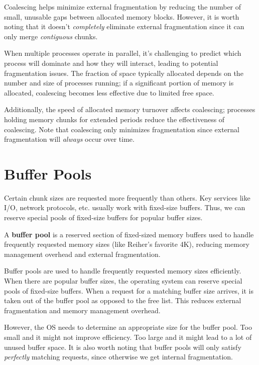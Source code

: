 \documentclass{report}
\newcommand{\definitionBegin}[1]{\begin{tcolorbox}[title={Definition: #1}]}
\newcommand{\definitionEnd}{\end{tcolorbox}}
\begin{document}
Coalescing helps minimize external fragmentation by reducing the number of small, unusable gaps
between allocated memory blocks. However, it is worth noting that it doesn't \textit{completely}
eliminate external fragmentation since it can only merge \textit{contiguous} chunks.

When multiple processes operate in parallel, it's challenging to predict which process will dominate
and how they will interact, leading to potential fragmentation issues. The fraction of space
typically allocated depends on the number and size of processes running; if a significant portion of
memory is allocated, coalescing becomes less effective due to limited free space.

Additionally, the speed of allocated memory turnover affects coalescing; processes holding memory
chunks for extended periods reduce the effectiveness of coalescing. Note that coalescing only
minimizes fragmentation since external fragmentation will \textit{always} occur over time.





\section{Buffer Pools}
Certain chunk sizes are requested more frequently than others. Key services like I/O, network
protocols, etc. usually work with fixed-size buffers. Thus, we can reserve special pools of
fixed-size buffers for popular buffer sizes.

\definitionBegin{Buffer Pool}
A \textbf{buffer pool} is a reserved section of fixed-sized memory buffers used to handle frequently
requested memory sizes (like Reiher's favorite 4K), reducing memory management overhead and external
fragmentation.
\definitionEnd

Buffer pools are used to handle frequently requested memory sizes efficiently. When there are
popular buffer sizes, the operating system can reserve special pools of fixed-size
buffers. When a request for a matching buffer size arrives, it is taken out of the buffer pool as
opposed to the free list. This reduces external fragmentation and memory management overhead.

However, the OS needs to determine an appropriate size for the buffer pool. Too small and it might
not improve efficiency. Too large and it might lead to a lot of unused buffer space.
It is also worth noting that buffer pools will only satisfy \textit{perfectly} matching requests,
since otherwise we get internal fragmentation.
\end{document}
